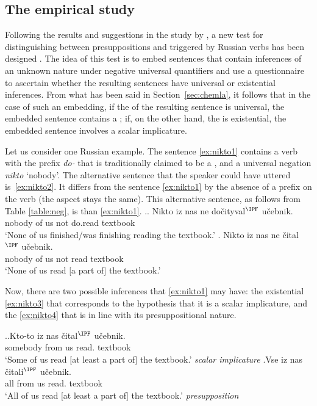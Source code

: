 \subsection{The empirical study}\label{empirical}
Following the results and suggestions in the study by \citet{Chemla:09}, a new test for distinguishing between presuppositions and  triggered by Russian verbs has been designed \citep{ZinovaFilip:SALT}. The idea of this test is to embed sentences that contain inferences of an unknown nature under negative universal quantifiers and use a questionnaire to ascertain whether the resulting sentences have universal or existential inferences. From what has been said in Section~\ref{sec:chemla}, it follows that in the case of such an embedding, if the  of the resulting sentence is universal, the embedded sentence contains a ; if, on the other hand, the  is existential, the embedded sentence involves a scalar implicature.

Let us consider one Russian example. The sentence \ref{ex:nikto1} contains a verb with the  prefix \textit{do-} that is traditionally claimed to be a , and a universal negation \textit{nikto} `nobody'. The alternative sentence that the speaker could have uttered is~\ref{ex:nikto2}. It differs from the sentence \ref{ex:nikto1} by the absence of a prefix on the verb (the aspect stays the same). This alternative sentence, as follows from Table \ref{table:neg}, is  than \ref{ex:nikto1}.
\ex.\label{ex:nikto}\ag. \label{ex:nikto1}Nikto iz nas ne do\v{c}ityval$^{\IPF}$ u\v{c}ebnik.\\
nobody of us not do.read textbook\\
 `None of us finished/was finishing reading the textbook.'
\bg. \label{ex:nikto2}Nikto iz nas ne \v{c}ital$^{\IPF}$ u\v{c}ebnik.\\
nobody of us not read textbook\\
 `None of us read $[$a part of$]$ the textbook.'

Now, there are two possible inferences that \ref{ex:nikto1} may have: the existential  \ref{ex:nikto3} that corresponds to the hypothesis that it is a scalar implicature, and the  \ref{ex:nikto4} that is in line with its presuppositional nature.

\ex.\ag.\label{ex:nikto3}Kto-to iz nas \v{c}ital$^{\IPF}$ u\v{c}ebnik.\\
somebody from us read. textbook\\
`Some of us read $[$at least a part of$]$ the textbook.' \hfill \textit{scalar implicature}
\bg.\label{ex:nikto4}Vse iz nas \v{c}itali$^{\IPF}$ u\v{c}ebnik.\\
all from us read. textbook\\
`All of us read $[$at least a part of$]$ the textbook.' \hfill \textit{presupposition}

